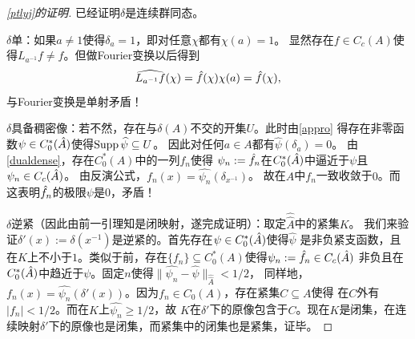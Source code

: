 \begin{proof}[\ref{ptlyj}的证明]
已经证明$\delta$是连续群同态。

$\delta$单：如果$a \neq 1$使得$\delta_a = 1$，即对任意$\chi$都有$\chi(a) = 1$。
显然存在$f \in C_c(A)$使得$L_{a^{-1}}f \neq f$。但做Fourier变换以后得到
\[\widehat{L_{a^{-1}}f}(\chi) = \hat{f}(\chi)\chi(a) = \hat{f}(\chi),\]
与Fourier变换是单射矛盾！

$\delta$具备稠密像：若不然，存在与$\delta(A)$不交的开集$U$。此时由\ref{appro}
得存在非零函数$\psi \in C_0^*(\hat{A})$使得$\operatorname{Supp} \widehat{\psi} \subseteq U$。
因此对任何$a \in A$都有$\widehat{\psi}(\delta_a) = 0$。
由\ref{dualdense}，存在$C_0^*(A)$中的一列$f_n$使得
$\psi_n := \hat{f}_n$在$C_0^*(\hat{A})$中逼近于$\psi$且$\psi_n \in C_c(\hat{A})$。
由反演公式，$f_n(x) = \widehat{\psi_n}(\delta_{x^{-1}})$。
故在$A$中$f_n$一致收敛于$0$。而这表明$\hat{f}_n$的极限$\psi$是$0$，矛盾！

$\delta$逆紧（因此由前一引理知是闭映射，遂完成证明）：取定$\widehat{\widehat{A}}$中的紧集$K$。
我们来验证$\delta'(x) :=\delta(x^{-1})$是逆紧的。首先存在$\psi \in C_0^*(\hat{A})$使得$\widehat{\psi}$
是非负紧支函数，且在$K$上不小于$1$。类似于前，存在$\{f_n\} \subseteq C_0^*(A)$使得$\psi_n := \hat{f}_n \in C_c(\hat{A})$
非负且在$C_0^*(\hat{A})$中趋近于$\psi$。固定$n$使得$\|\widehat{\psi_n} - \widehat{\psi}\|_{\widehat{\widehat{A}}} < 1/2$，
同样地，$f_n(x) = \widehat{\psi_n}(\delta'(x))$。因为$f_n \in C_0(A)$，存在紧集$C \subseteq A$使得
在$C$外有$|f_n|<1/2$。而在$K$上$\widehat{\psi_n} \geqslant 1/2$，故
$K$在$\delta'$下的原像包含于$C$。现在$K$是闭集，在连续映射$\delta'$下的原像也是闭集，而紧集中的闭集也是紧集，证毕。
\end{proof}

